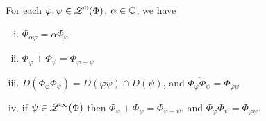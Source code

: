 \begin{lem} 
\label{maintheorem4}
  
 For each $\varphi, \psi \in \mathscr{L}^0(\Phi)$, $\alpha \in \mathbb{C}$, we have

\begin{enumerate}[(i)]
  \item $\Phi_{\alpha \varphi} = \alpha \Phi_\varphi$
  \item $ \overline{\Phi_\varphi + \Phi_\psi} = \Phi_{\varphi + \psi}$
  \item $D(\Phi_\varphi \Phi_\psi) = D(\varphi \psi) \cap D(\psi)$, and 
  $\overline{\Phi_\varphi \Phi_\psi} = \Phi_{\varphi \psi}$
  \item if $\psi \in \mathscr{L}^\infty (\Phi)$ then $\Phi_\varphi + \Phi_\psi =
  \Phi_{\varphi+\psi}$, and $\Phi_\varphi \Phi_\psi = \Phi_{\varphi \psi}$.
\end{enumerate}

  
\end{lem}

